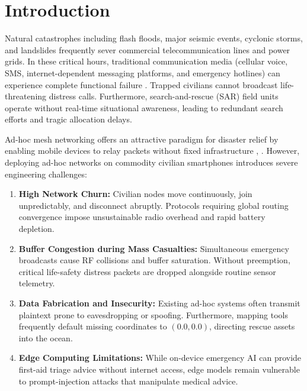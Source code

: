 \documentclass[conference,a4paper]{IEEEtran}
\begin{document}
\section{Introduction}
Natural catastrophes including flash floods, major seismic events, cyclonic storms, and landslides frequently sever commercial telecommunication lines and power grids. In these critical hours, traditional communication media (cellular voice, SMS, internet-dependent messaging platforms, and emergency hotlines) can experience complete functional failure \cite{16}. Trapped civilians cannot broadcast life-threatening distress calls. Furthermore, search-and-rescue (SAR) field units operate without real-time situational awareness, leading to redundant search efforts and tragic allocation delays.

Ad-hoc mesh networking offers an attractive paradigm for disaster relief by enabling mobile devices to relay packets without fixed infrastructure \cite{2}, \cite{3}. However, deploying ad-hoc networks on commodity civilian smartphones introduces severe engineering challenges:
\begin{enumerate}
    \setlength{\itemsep}{1.5pt}
    \setlength{\parskip}{0pt}
    \item \textbf{High Network Churn:} Civilian nodes move continuously, join unpredictably, and disconnect abruptly. Protocols requiring global routing convergence impose unsustainable radio overhead and rapid battery depletion.
    \item \textbf{Buffer Congestion during Mass Casualties:} Simultaneous emergency broadcasts cause RF collisions and buffer saturation. Without preemption, critical life-safety distress packets are dropped alongside routine sensor telemetry.
    \item \textbf{Data Fabrication and Insecurity:} Existing ad-hoc systems often transmit plaintext prone to eavesdropping or spoofing. Furthermore, mapping tools frequently default missing coordinates to $(0.0, 0.0)$, directing rescue assets into the ocean.
    \item \textbf{Edge Computing Limitations:} While on-device emergency AI can provide first-aid triage advice without internet access, edge models remain vulnerable to prompt-injection attacks that manipulate medical advice.
\end{enumerate}
\end{document}

